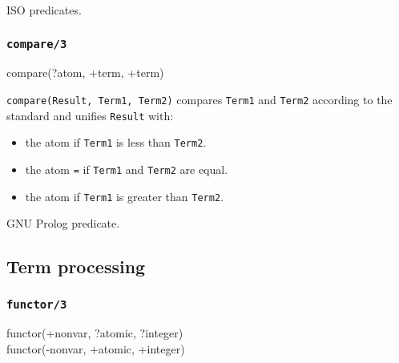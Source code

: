 \PlErrorsNone

\Portability

ISO predicates.

\subsubsection{\texttt{compare/3}}
\label{compare/3} 

\begin{TemplatesOneCol}
compare(?atom, +term, +term)

\end{TemplatesOneCol}

\Description

\texttt{compare(Result, Term1, Term2)} compares \texttt{Term1} and
\texttt{Term2} according to the standard  and unifies \texttt{Result} with:

\begin{itemize}

\item the atom \texttt{{\lt}} if \texttt{Term1} is less than \texttt{Term2}.

\item the atom \texttt{=} if \texttt{Term1} and \texttt{Term2} are equal.

\item the atom \texttt{{\gt}} if \texttt{Term1} is greater than
\texttt{Term2}.

\end{itemize}

\begin{PlErrors}


\end{PlErrors}

\Portability

GNU Prolog predicate.

\subsection{Term processing}

\subsubsection{\texttt{functor/3}}
\label{functor/3}

\begin{TemplatesOneCol}
functor(+nonvar, ?atomic, ?integer)\\
functor(-nonvar, +atomic, +integer)

\end{TemplatesOneCol}

